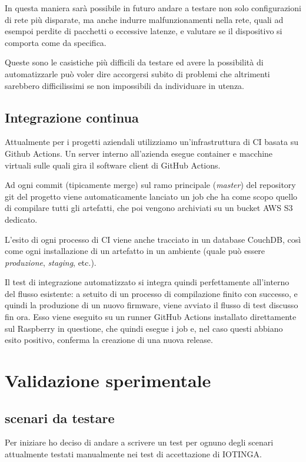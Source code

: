 \documentclass[12pt,a4paper,twoside,titlepage]{book}
\begin{document}
In questa maniera sarà possibile in futuro andare a testare non solo configurazioni
di rete più disparate, ma anche indurre malfunzionamenti nella rete, quali  ad esempoi
perdite di pacchetti o eccessive latenze, e valutare se il dispositivo si comporta come
da specifica.

Queste sono le casistiche più difficili da testare ed avere la possibilità di automatizzarle
può voler dire accorgersi subito di problemi che altrimenti sarebbero difficilissimi
se non impossibili da individuare in utenza.


\section{Integrazione continua}

Attualmente per i progetti aziendali utilizziamo un'infrastruttura di CI basata
su Github Actions. Un server interno all'azienda esegue container e macchine virtuali
sulle quali gira il software client di GitHub Actions.

Ad ogni commit (tipicamente merge) sul ramo principale (\textit{master}) del repository
git del progetto viene automaticamente lanciato un job che ha come scopo quello
di compilare tutti gli artefatti, che poi vengono archiviati su un bucket AWS S3
dedicato.

L'esito di ogni processo di CI viene anche tracciato in un database CouchDB,
così come ogni installazione di un artefatto in un ambiente (quale può essere
\textit{produzione}, \textit{staging}, etc.).

Il test di integrazione automatizzato si integra quindi perfettamente all'interno
del flusso esistente: a setuito di un processo di compilazione finito con successo,
e quindi la produzione di un nuovo firmware, viene avviato il flusso di test discusso
fin ora. Esso viene eseguito su un runner GitHub Actions installato direttamente
sul Raspberry in questione, che quindi esegue i job e, nel caso questi abbiano
esito positivo, conferma la creazione di una nuova release.

\chapter{Validazione sperimentale}

\section{scenari da testare}

Per iniziare ho deciso di andare a scrivere un test per ognuno degli scenari attualmente
testati manualmente nei test di accettazione di IOTINGA.
\end{document}
